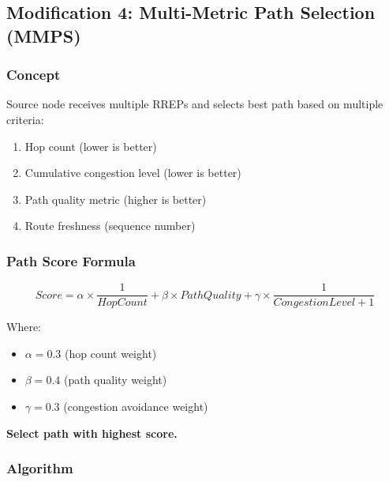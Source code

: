 \documentclass[12pt,a4paper]{article}
\begin{document}

\subsection{Modification 4: Multi-Metric Path Selection (MMPS)}

\subsubsection{Concept}
Source node receives multiple RREPs and selects best path based on multiple criteria:

\begin{enumerate}
    \item Hop count (lower is better)
    \item Cumulative congestion level (lower is better)
    \item Path quality metric (higher is better)
    \item Route freshness (sequence number)
\end{enumerate}

\subsubsection{Path Score Formula}

\begin{equation}
Score = \alpha \times \frac{1}{HopCount} + \beta \times PathQuality + \gamma \times \frac{1}{CongestionLevel + 1}
\end{equation}

Where:
\begin{itemize}
    \item $\alpha = 0.3$ (hop count weight)
    \item $\beta = 0.4$ (path quality weight)
    \item $\gamma = 0.3$ (congestion avoidance weight)
\end{itemize}

\textbf{Select path with highest score.}

\subsubsection{Algorithm}
\end{document}
